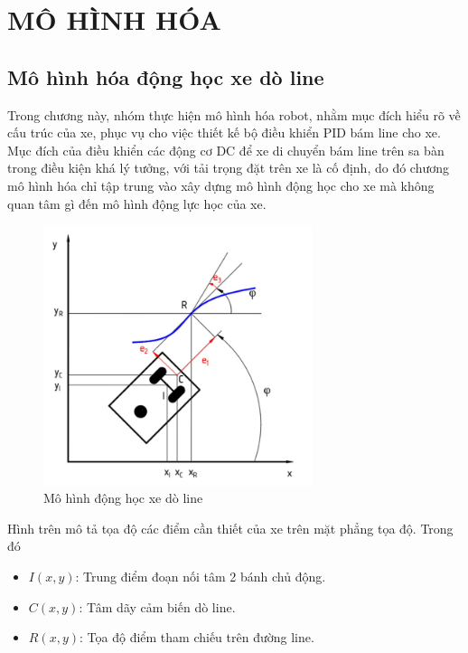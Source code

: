 \chapter{MÔ HÌNH HÓA}
     \section{Mô hình hóa động học xe dò line}
          \hspace*{0.6cm}Trong chương này, nhóm thực hiện mô hình hóa robot, nhằm mục đích hiểu rõ về cấu trúc của xe, phục vụ cho việc thiết kế bộ điều khiển PID bám line cho xe.
          \newline
          \hspace*{0.6cm}Mục đích của điều khiển các động cơ DC để xe di chuyển bám line trên sa bàn trong điều kiện khá lý tưởng, với tải trọng đặt trên xe là cố định, do đó chương mô hình hóa chỉ tập trung vào xây dựng mô hình động học cho xe mà không quan tâm 
          gì đến mô hình động lực học của xe.
          \begin{figure}[H]
               \centering
               \includegraphics[width=0.7\textwidth]{pictures/chapter5/chapter5_pic1.png}
               \caption{Mô hình động học xe dò line}
               \label{kinematic_model}
          \end{figure}         
          Hình trên mô tả tọa độ các điểm cần thiết của xe trên mặt phẳng tọa độ. Trong đó
          \begin{itemize}
               \item $I(x, y)$: Trung điểm đoạn nối tâm 2 bánh chủ động.
               \item $C(x, y)$: Tâm dãy cảm biến dò line.
               \item $R(x, y)$: Tọa độ điểm tham chiếu trên đường line.
          \end{itemize}
